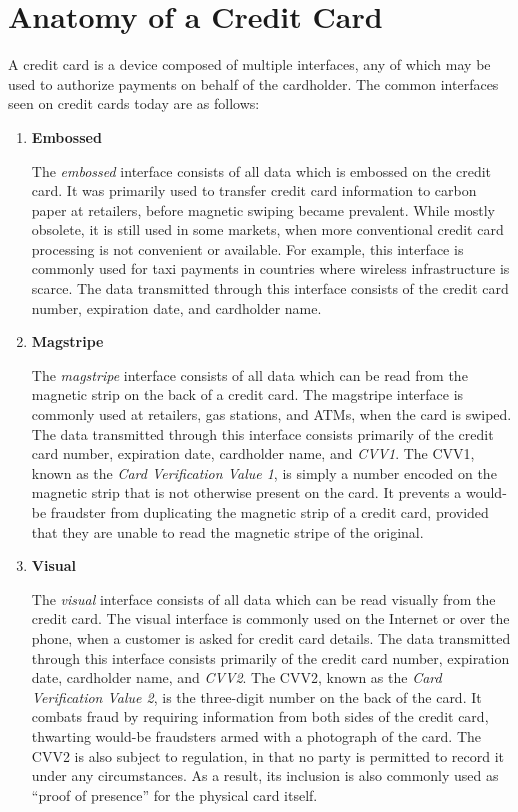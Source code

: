 \section{Anatomy of a Credit Card}

A credit card is a device composed of multiple interfaces, any of which may be used to authorize payments on behalf of the cardholder.
The common interfaces seen on credit cards today are as follows:

\begin{enumerate}
\item \textbf{Embossed}

The \emph{embossed} interface consists of all data which is embossed on the credit card.
It was primarily used to transfer credit card information to carbon paper at retailers, before magnetic swiping became prevalent.
While mostly obsolete, it is still used in some markets, when more conventional credit card processing is not convenient or available.
For example, this interface is commonly used for taxi payments in countries where wireless infrastructure is scarce.
The data transmitted through this interface consists of the credit card number, expiration date, and cardholder name.

\item \textbf{Magstripe}

The \emph{magstripe} interface consists of all data which can be read from the magnetic strip on the back of a credit card.
The magstripe interface is commonly used at retailers, gas stations, and ATMs, when the card is swiped.
The data transmitted through this interface consists primarily of the credit card number, expiration date, cardholder name, and \emph{CVV1}.
The CVV1, known as the \emph{Card Verification Value 1}, is simply a number encoded on the magnetic strip that is not otherwise present on the card.
It prevents a would-be fraudster from duplicating the magnetic strip of a credit card, provided that they are unable to read the magnetic stripe of the original.

\item \textbf{Visual}

The \emph{visual} interface consists of all data which can be read visually from the credit card.
The visual interface is commonly used on the Internet or over the phone, when a customer is asked for credit card details.
The data transmitted through this interface consists primarily of the credit card number, expiration date, cardholder name, and \emph{CVV2}.
The CVV2, known as the \emph{Card Verification Value 2}, is the three-digit number on the back of the card.
It combats fraud by requiring information from both sides of the credit card, thwarting would-be fraudsters armed with a photograph of the card.
The CVV2 is also subject to regulation, in that no party is permitted to record it under any circumstances.
As a result, its inclusion is also commonly used as ``proof of presence'' for the physical card itself.


\end{enumerate}
